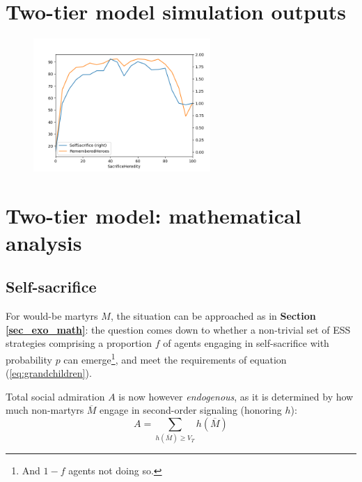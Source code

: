 \documentclass[a4paper,12pt]{report}
\begin{document}


\section{Two-tier model simulation outputs}



\begin{figure}[h]
    \centering
    \includegraphics[width=0.6\textwidth]{Hered_a50}
    \caption{}
    \label{fig:h}
    \end{figure}


















\section{Two-tier model: mathematical analysis}

\subsection{Self-sacrifice}

For would-be martyrs $M$, the situation can be approached as in \textbf{Section \ref{sec_exo_math}}: the question comes down
to whether a non-trivial set of ESS strategies comprising a proportion $f$ of agents engaging in
self-sacrifice with probability $p$ can emerge\footnote{And $1-f$ agents not doing so.},
and meet the requirements of equation (\ref{eq:grandchildren}).

Total social admiration $A$ is now however \emph{endogenous}, as it is determined by how much
non-martyrs $\overline{M}$ engage in second-order signaling (honoring $h$):
\begin{equation}
    \label{eq:A_h}
        A = \sum_{h(\overline{M}) \geq V_T}{h(\overline{M})}
\end{equation}
\end{document}
